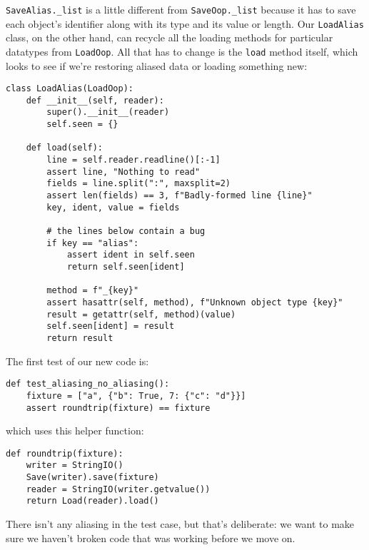 \documentclass{scrbook}
\begin{document}
\texttt{SaveAlias.\_list} is a little different from \texttt{SaveOop.\_list}
because it has to save each object's identifier
along with its type and its value or length.
Our \texttt{LoadAlias} class,
on the other hand,
can recycle all the loading methods for particular datatypes
from \texttt{LoadOop}.
All that has to change is the \texttt{load} method itself,
which looks to see if we're restoring aliased data
or loading something new:


\begin{lstlisting}[frame=single,frameround=tttt]
class LoadAlias(LoadOop):
    def __init__(self, reader):
        super().__init__(reader)
        self.seen = {}

    def load(self):
        line = self.reader.readline()[:-1]
        assert line, "Nothing to read"
        fields = line.split(":", maxsplit=2)
        assert len(fields) == 3, f"Badly-formed line {line}"
        key, ident, value = fields

        # the lines below contain a bug
        if key == "alias":
            assert ident in self.seen
            return self.seen[ident]

        method = f"_{key}"
        assert hasattr(self, method), f"Unknown object type {key}"
        result = getattr(self, method)(value)
        self.seen[ident] = result
        return result
\end{lstlisting}



The first test of our new code is:


\begin{lstlisting}[frame=single,frameround=tttt]
def test_aliasing_no_aliasing():
    fixture = ["a", {"b": True, 7: {"c": "d"}}]
    assert roundtrip(fixture) == fixture
\end{lstlisting}



\noindent which uses this helper function:


\begin{lstlisting}[frame=single,frameround=tttt]
def roundtrip(fixture):
    writer = StringIO()
    Save(writer).save(fixture)
    reader = StringIO(writer.getvalue())
    return Load(reader).load()
\end{lstlisting}



\noindent There isn't any aliasing in the test case,
but that's deliberate:
we want to make sure we haven't broken code that was working
before we move on.
\end{document}
